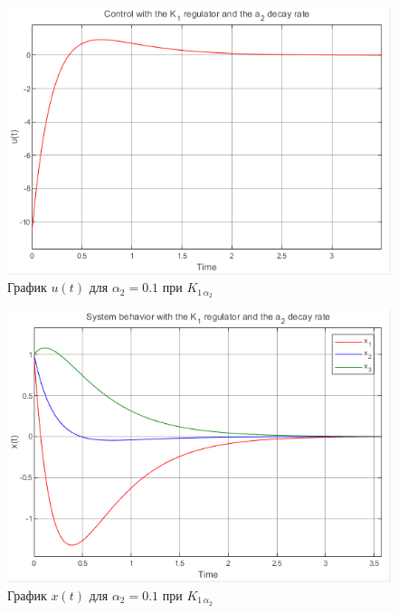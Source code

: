\documentclass[a4paper, 12pt]{article}
\begin{document}
    \begin{figure}[H]
        \centering
        \includegraphics{1task_K1a2_u.png}
        \captionsetup{skip=0pt}
        \caption{График $u(t)$ для $\alpha_2=0.1$ при $K_{1\,\alpha_2}$}
        \label{fig:1task_K1a2_u}
    \end{figure}
    \begin{figure}[H]
        \centering
        \includegraphics{1task_K1a2_x.png}
        \captionsetup{skip=0pt}
        \caption{График $x(t)$ для $\alpha_2=0.1$ при $K_{1\,\alpha_2}$}
        \label{fig:1task_K1a2_x}
    \end{figure}
    \newpage
    \vspace*{0.01mm}
\end{document}
